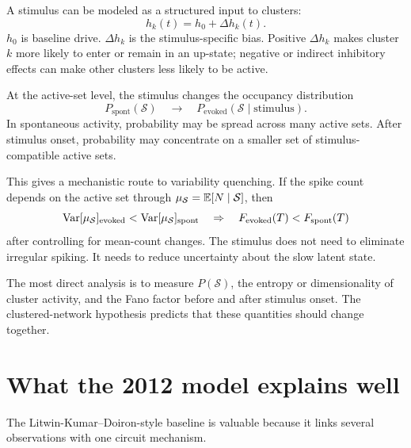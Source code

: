 A stimulus can be modeled as a structured input to clusters:
%
\begin{equation}
  h_k(t)
  =
  h_0+\Delta h_k(t).
  \label{eq:stimulus-cluster-input}
\end{equation}
%
$h_0$ is baseline drive. $\Delta h_k$ is the stimulus-specific bias. Positive $\Delta h_k$ makes cluster $k$ more likely to enter or remain in an up-state; negative or indirect inhibitory effects can make other clusters less likely to be active.

At the active-set level, the stimulus changes the occupancy distribution
%
\begin{equation}
  P_{\mathrm{spont}}(\mathcal{S})
  \quad\longrightarrow\quad
  P_{\mathrm{evoked}}(\mathcal{S}\mid \text{stimulus}).
  \label{eq:state-occupancy-stimulus}
\end{equation}
%
In spontaneous activity, probability may be spread across many active sets. After stimulus onset, probability may concentrate on a smaller set of stimulus-compatible active sets.

This gives a mechanistic route to variability quenching. If the spike count depends on the active set through $\mu_{\mathcal{S}}=\mathbb{E}[N\mid \mathcal{S}]$, then
%
\begin{equation}
  \operatorname{Var}[\mu_{\mathcal{S}}]_{\mathrm{evoked}}
  <
  \operatorname{Var}[\mu_{\mathcal{S}}]_{\mathrm{spont}}
  \quad
  \Rightarrow
  \quad
  F_{\mathrm{evoked}}(T)<F_{\mathrm{spont}}(T)
  \label{eq:stimulus-quenching-state-variance}
\end{equation}
%
after controlling for mean-count changes. The stimulus does not need to eliminate irregular spiking. It needs to reduce uncertainty about the slow latent state.

The most direct analysis is to measure $P(\mathcal{S})$, the entropy or dimensionality of cluster activity, and the Fano factor before and after stimulus onset. The clustered-network hypothesis predicts that these quantities should change together.

\section{What the 2012 model explains well}
\label{sec:model-explains-well}

The Litwin-Kumar--Doiron-style baseline is valuable because it links several observations with one circuit mechanism.


